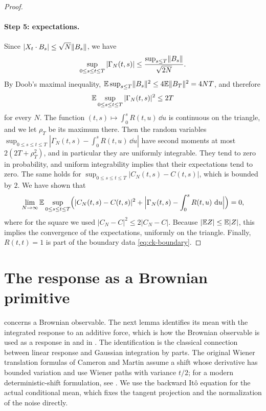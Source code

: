 \begin{proof}
\paragraph{Step 5: expectations.}
Since $|X_t\cdot B_s|\le\sqrt N\lVert B_s\rVert$, we have
\[
 \sup_{0\le s\le t\le T}|\Gamma_N(t,s)|\le\frac{\sup_{s\le T}\lVert B_s\rVert}{\sqrt{2N}}.
\]
By Doob's maximal inequality, $\mathbb E\sup_{s\le T}\lVert B_s\rVert^2\le4\mathbb E\lVert B_T\rVert^2=4NT$, and therefore
\[
 \mathbb E\sup_{0\le s\le t\le T}|\Gamma_N(t,s)|^2\le2T
\]
for every $N$. The function $(t,s)\mapsto\int_0^sR(t,u)\,\dd u$ is continuous on the triangle, and we let $\rho_T$ be its maximum there. Then the random variables $\sup_{0\le s\le t\le T}|\Gamma_N(t,s)-\int_0^sR(t,u)\,\dd u|$ have second moments at most $2(2T+\rho_T^2)$, and in particular they are uniformly integrable. They tend to zero in probability, and uniform integrability implies that their expectations tend to zero. The same holds for $\sup_{0\le s\le t\le T}|C_N(t,s)-C(t,s)|$, which is bounded by $2$. We have shown that
\begin{equation}\label{eq:bridge-l1}
 \lim_{N\to\infty}\mathbb E\sup_{0\le s\le t\le T}\Bigl(|C_N(t,s)-C(t,s)|^2
 +\Bigl|\Gamma_N(t,s)-\int_0^sR(t,u)\,\mathop{}\!\mathrm d u\Bigr|\Bigr)=0,
\end{equation}
where for the square we used $|C_N-C|^2\le2|C_N-C|$. Because $|\mathbb E Z|\le\mathbb E|Z|$, this implies the convergence of the expectations, uniformly on the triangle. Finally, $R(t,t)=1$ is part of the boundary data \eqref{eq:ck-boundary}.
\end{proof}

\section{The response as a Brownian primitive}\label{sec:brownian-primitive}

 concerns a Brownian observable. The next lemma identifies its mean with the integrated response to an additive force, which is how the Brownian observable is used as a response in \cite[arXiv version~1, Equation~(1.9), p.~4, and Theorem~1.2, p.~5]{bag2006} and in \cite[arXiv version~5, Theorem~4.3, p.~23]{sellke2024}. The identification is the classical connection between linear response and Gaussian integration by parts. The original Wiener translation formulas of Cameron and Martin \cite[Theorems~1--2, pp.~386--387]{cameronmartin1944} assume a shift whose derivative has bounded variation and use Wiener paths with variance $t/2$; for a modern deterministic-shift formulation, see \cite[Exercise~4.29, p.~27, and Theorem~4.44, p.~31]{hairer2025spde}. We use the backward It\^o equation for the actual conditional mean, which fixes the tangent projection and the normalization of the noise directly.

